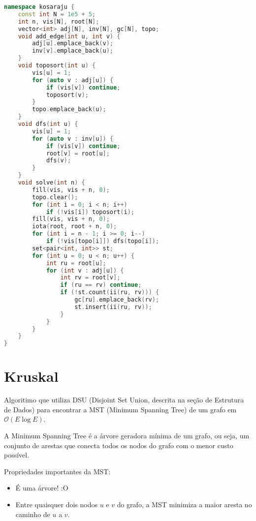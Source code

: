 \documentclass[10pt, a4paper, oneside]{book}
\begin{document}
\begin{lstlisting}[language=C++]
namespace kosaraju {
    const int N = 1e5 + 5;
    int n, vis[N], root[N];
    vector<int> adj[N], inv[N], gc[N], topo;
    void add_edge(int u, int v) {
        adj[u].emplace_back(v);
        inv[v].emplace_back(u);
    }
    void toposort(int u) {
        vis[u] = 1;
        for (auto v : adj[u]) {
            if (vis[v]) continue;
            toposort(v);
        }
        topo.emplace_back(u);
    }
    void dfs(int u) {
        vis[u] = 1;
        for (auto v : inv[u]) {
            if (vis[v]) continue;
            root[v] = root[u];
            dfs(v);
        }
    }
    void solve(int n) {
        fill(vis, vis + n, 0);
        topo.clear();
        for (int i = 0; i < n; i++)
            if (!vis[i]) toposort(i);
        fill(vis, vis + n, 0);
        iota(root, root + n, 0);
        for (int i = n - 1; i >= 0; i--)
            if (!vis[topo[i]]) dfs(topo[i]);
        set<pair<int, int>> st;
        for (int u = 0; u < n; u++) {
            int ru = root[u];
            for (int v : adj[u]) {
                int rv = root[v];
                if (ru == rv) continue;
                if (!st.count(ii(ru, rv))) {
                    gc[ru].emplace_back(rv);
                    st.insert(ii(ru, rv));
                }
            }
        }
    }
}
\end{lstlisting}
\hfill

\section{Kruskal}


Algoritimo que utiliza DSU (Disjoint Set Union, descrita na seção de Estrutura de Dados) para encontrar a MST (Minimum Spanning Tree) de um grafo em $\mathcal{O}(E \log E)$.



A Minimum Spanning Tree é a árvore geradora mínima de um grafo, ou seja, um conjunto de arestas que conecta todos os nodos do grafo com o menor custo possível.



Propriedades importantes da MST:



\begin{itemize}
\item É uma árvore! :O
\item Entre quaisquer dois nodos $u$ e $v$ do grafo, a MST minimiza a maior aresta no caminho de $u$ a $v$.
\end{itemize}
\end{document}
